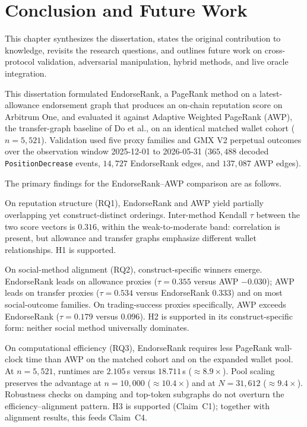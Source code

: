 \chapter{Conclusion and Future Work}
\label{ch:conclusion}

This chapter synthesizes the dissertation, states the original contribution to knowledge, revisits the research questions, and outlines future work on cross-protocol validation, adversarial manipulation, hybrid methods, and live oracle integration.


This dissertation formulated EndorseRank, a PageRank method on a latest-allowance endorsement graph that produces an on-chain reputation score on Arbitrum One, and evaluated it against Adaptive Weighted PageRank (AWP), the transfer-graph baseline of Do et al., on an identical matched wallet cohort ($n=5{,}521$). Validation used five proxy families and GMX V2 perpetual outcomes over the observation window 2025-12-01 to 2026-05-31 ($365{,}488$ decoded \texttt{PositionDecrease} events, $14{,}727$ EndorseRank edges, and $137{,}087$ AWP edges).

The primary findings for the EndorseRank--AWP comparison are as follows.

On reputation structure (RQ1), EndorseRank and AWP yield partially overlapping yet construct-distinct orderings. Inter-method Kendall $\tau$ between the two score vectors is $0.316$, within the weak-to-moderate band: correlation is present, but allowance and transfer graphs emphasize different wallet relationships. H1 is supported.

On social-method alignment (RQ2), construct-specific winners emerge. EndorseRank leads on allowance proxies ($\tau=0.355$ versus AWP $-0.030$); AWP leads on transfer proxies ($\tau=0.534$ versus EndorseRank $0.333$) and on most social-outcome families. On trading-success proxies specifically, AWP exceeds EndorseRank ($\tau=0.179$ versus $0.096$). H2 is supported in its construct-specific form: neither social method universally dominates.

On computational efficiency (RQ3), EndorseRank requires less PageRank wall-clock time than AWP on the matched cohort and on the expanded wallet pool. At $n=5{,}521$, runtimes are $2.105$\,s versus $18.711$\,s ($\approx 8.9\times$). Pool scaling preserves the advantage at $n=10{,}000$ ($\approx 10.4\times$) and at $N=31{,}612$ ($\approx 9.4\times$). Robustness checks on damping and top-token subgraphs do not overturn the efficiency--alignment pattern. H3 is supported (Claim~C1); together with alignment results, this feeds Claim~C4.

